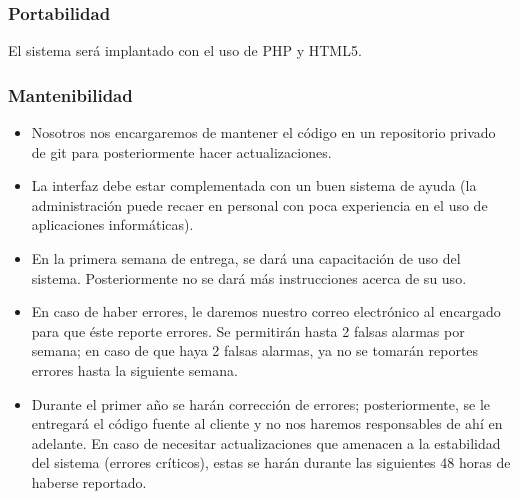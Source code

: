 \subsubsection{Portabilidad}

El sistema será implantado con el uso de PHP y HTML5. 


\subsubsection{Mantenibilidad}
\begin{itemize}
\item Nosotros nos encargaremos de mantener el código en un repositorio privado de git para
  posteriormente hacer actualizaciones.
\item La interfaz debe estar complementada con un buen sistema de ayuda (la administración puede recaer en personal con poca experiencia en el uso de aplicaciones informáticas). 
\item En la primera semana de entrega, se dará una capacitación de uso del sistema.  Posteriormente no se dará más instrucciones acerca de su uso.
 \item En caso de haber errores, le daremos nuestro correo electrónico al encargado para que éste reporte errores.  Se permitirán hasta 2 falsas alarmas por semana; en caso de que haya 2 falsas alarmas, ya no se tomarán reportes errores hasta la siguiente semana.
\item Durante el primer año se harán corrección de errores; posteriormente, se le entregará el código fuente al cliente y no nos haremos responsables de ahí en adelante.  En caso de necesitar actualizaciones que amenacen a la estabilidad del sistema (errores críticos), estas se harán durante las siguientes 48 horas de haberse reportado.
\end{itemize}



